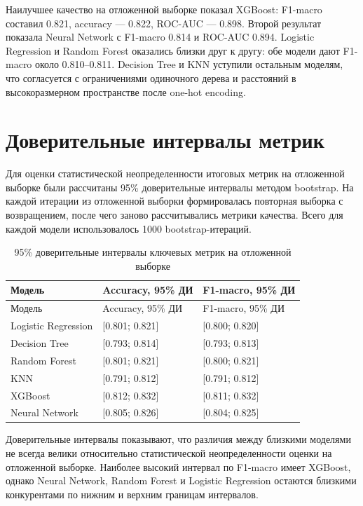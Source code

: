 \documentclass[14pt,a4paper]{extreport}
\begin{document}
Наилучшее качество на отложенной выборке показал XGBoost: F1-macro составил 0.821, accuracy --- 0.822, ROC-AUC --- 0.898. Второй результат показала Neural Network с F1-macro 0.814 и ROC-AUC 0.894. Logistic Regression и Random Forest оказались близки друг к другу: обе модели дают F1-macro около 0.810--0.811. Decision Tree и KNN уступили остальным моделям, что согласуется с ограничениями одиночного дерева и расстояний в высокоразмерном пространстве после one-hot encoding.

\section{Доверительные интервалы метрик}

Для оценки статистической неопределенности итоговых метрик на отложенной выборке были рассчитаны 95\% доверительные интервалы методом bootstrap. На каждой итерации из отложенной выборки формировалась повторная выборка с возвращением, после чего заново рассчитывались метрики качества. Всего для каждой модели использовалось 1000 bootstrap-итераций.

\scriptsize
\begin{longtable}{lll}
\caption{95\% доверительные интервалы ключевых метрик на отложенной выборке}\label{tab:metric_confidence_intervals}\\
\toprule
Модель & Accuracy, 95\% ДИ & F1-macro, 95\% ДИ \\
\midrule
\endfirsthead
\toprule
Модель & Accuracy, 95\% ДИ & F1-macro, 95\% ДИ \\
\midrule
\endhead
Logistic Regression & [0.801; 0.821] & [0.800; 0.820] \\
Decision Tree & [0.793; 0.814] & [0.793; 0.813] \\
Random Forest & [0.801; 0.821] & [0.800; 0.821] \\
KNN & [0.791; 0.812] & [0.791; 0.812] \\
XGBoost & [0.812; 0.832] & [0.811; 0.832] \\
Neural Network & [0.805; 0.826] & [0.804; 0.825] \\
\bottomrule
\end{longtable}
\normalsize

Доверительные интервалы показывают, что различия между близкими моделями не всегда велики относительно статистической неопределенности оценки на отложенной выборке. Наиболее высокий интервал по F1-macro имеет XGBoost, однако Neural Network, Random Forest и Logistic Regression остаются близкими конкурентами по нижним и верхним границам интервалов.
\end{document}
